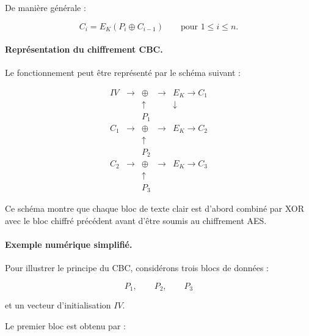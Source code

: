 \documentclass[12pt,a4paper]{article}
\begin{document}
De manière générale :

\[
\boxed{
C_i=E_K(P_i\oplus C_{i-1})
}
\qquad
\text{pour }1\leq i\leq n.
\]



\paragraph{Représentation du chiffrement CBC.}

Le fonctionnement peut être représenté par le schéma suivant :

\[
\begin{array}{ccccc}
IV & \longrightarrow & \boxed{\oplus} & \longrightarrow &
\boxed{E_K} \longrightarrow C_1
\\[0.3cm]
&& \uparrow && \downarrow
\\[-0.1cm]
&& P_1 &&
\\[0.8cm]
C_1 & \longrightarrow & \boxed{\oplus} & \longrightarrow &
\boxed{E_K} \longrightarrow C_2
\\[0.3cm]
&& \uparrow &&
\\[-0.1cm]
&& P_2 &&
\\[0.8cm]
C_2 & \longrightarrow & \boxed{\oplus} & \longrightarrow &
\boxed{E_K} \longrightarrow C_3
\\[0.3cm]
&& \uparrow &&
\\[-0.1cm]
&& P_3 &&
\end{array}
\]

Ce schéma montre que chaque bloc de texte clair est d'abord combiné
par XOR avec le bloc chiffré précédent avant d'être soumis au
chiffrement AES.



\paragraph{Exemple numérique simplifié.}

Pour illustrer le principe du CBC, considérons trois blocs de données :

\[
P_1,\qquad P_2,\qquad P_3
\]

et un vecteur d'initialisation $IV$.

Le premier bloc est obtenu par :
\end{document}
